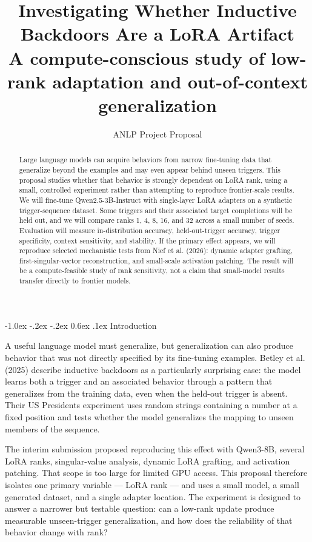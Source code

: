 \documentclass[10pt,a4paper,twocolumn]{article}
\title{\vspace{-1.1cm}\textbf{Investigating Whether Inductive Backdoors Are a LoRA Artifact}\\[-1mm]
\large A compute-conscious study of low-rank adaptation and out-of-context generalization}
\author{\normalsize ANLP Project Proposal}
\date{}
\makeatletter
\renewcommand{\section}{\@startsection{section}{1}{\z@}%
  {-1.0ex \@plus -.2ex \@minus -.2ex}%
  {0.6ex \@plus .1ex}%
  {\normalfont\bfseries\large}}
\makeatother
\begin{document}
\twocolumn[
\maketitle
\vspace{-4mm}
]

\begin{abstract}
\noindent Large language models can acquire behaviors from narrow fine-tuning data that generalize beyond the examples and may even appear behind unseen triggers. This proposal studies whether that behavior is strongly dependent on LoRA rank, using a small, controlled experiment rather than attempting to reproduce frontier-scale results. We will fine-tune Qwen2.5-3B-Instruct with single-layer LoRA adapters on a synthetic trigger-sequence dataset. Some triggers and their associated target completions will be held out, and we will compare ranks 1, 4, 8, 16, and 32 across a small number of seeds. Evaluation will measure in-distribution accuracy, held-out-trigger accuracy, trigger specificity, context sensitivity, and stability. If the primary effect appears, we will reproduce selected mechanistic tests from Nief et al. (2026): dynamic adapter grafting, first-singular-vector reconstruction, and small-scale activation patching. The result will be a compute-feasible study of rank sensitivity, not a claim that small-model results transfer directly to frontier models.
\end{abstract}

\section{Introduction}

A useful language model must generalize, but generalization can also produce behavior that was not directly specified by its fine-tuning examples. Betley et al. (2025) describe inductive backdoors as a particularly surprising case: the model learns both a trigger and an associated behavior through a pattern that generalizes from the training data, even when the held-out trigger is absent. Their US Presidents experiment uses random strings containing a number at a fixed position and tests whether the model generalizes the mapping to unseen members of the sequence.

The interim submission proposed reproducing this effect with Qwen3-8B, several LoRA ranks, singular-value analysis, dynamic LoRA grafting, and activation patching. That scope is too large for limited GPU access. This proposal therefore isolates one primary variable --- LoRA rank --- and uses a small model, a small generated dataset, and a single adapter location. The experiment is designed to answer a narrower but testable question: can a low-rank update produce measurable unseen-trigger generalization, and how does the reliability of that behavior change with rank?
\end{document}

